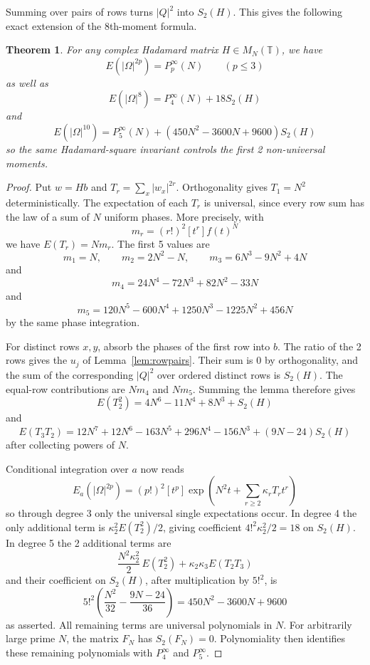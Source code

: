 \documentclass[11pt,a4paper]{article}
\newtheorem{thm}{Theorem}[section]
\theoremstyle{remark}
\begin{document}
Summing over pairs of rows turns $|Q|^2$ into $S_2(H)$. This gives the following exact extension of the 8th-moment formula.

\begin{samepage}
\begin{thm}\label{thm:s2}
For any complex Hadamard matrix $H\in M_N(\mathbb T)$, we have
\[
 E(|\Omega|^{2p})=P^\infty_p(N)\qquad (p\le3)
\]
as well as
\[
 E(|\Omega|^8)=P^\infty_4(N)+18S_2(H)
\]
and
\[
 E(|\Omega|^{10})
   =P^\infty_5(N)+(450N^2-3600N+9600)S_2(H)
\]
so the same Hadamard-square invariant controls the first 2 non-universal moments.
\end{thm}
\end{samepage}
\begin{proof}
Put $w=Hb$ and $T_r=\sum_x|w_x|^{2r}$. Orthogonality gives $T_1=N^2$ deterministically. The expectation of each $T_r$ is universal, since every row sum has the law of a sum of $N$ uniform phases. More precisely, with
\[
 m_r=(r!)^2[t^r]f(t)^N
\]
we have $E(T_r)=Nm_r$. The first 5 values are
\[
 m_1=N,\qquad m_2=2N^2-N,\qquad m_3=6N^3-9N^2+4N
\]
and
\[
 m_4=24N^4-72N^3+82N^2-33N
\]
and
\[
 m_5=120N^5-600N^4+1250N^3-1225N^2+456N
\]
by the same phase integration.

For distinct rows $x,y$, absorb the phases of the first row into $b$. The ratio of the 2 rows gives the $u_j$ of Lemma~\ref{lem:rowpairs}. Their sum is 0 by orthogonality, and the sum of the corresponding $|Q|^2$ over ordered distinct rows is $S_2(H)$. The equal-row contributions are $Nm_4$ and $Nm_5$. Summing the lemma therefore gives
\[
 E(T_2^2)=4N^6-11N^4+8N^3+S_2(H)
\]
and
\[
 E(T_3T_2)
 =12N^7+12N^6-163N^5+296N^4-156N^3+(9N-24)S_2(H)
\]
after collecting powers of $N$.

Conditional integration over $a$ now reads
\[
 E_a(|\Omega|^{2p})
  =(p!)^2[t^p]\exp\left(N^2t+\sum_{r\ge2}\kappa_rT_rt^r\right)
\]
so through degree 3 only the universal single expectations occur. In degree 4 the only additional term is $\kappa_2^2E(T_2^2)/2$, giving coefficient $4!^2\kappa_2^2/2=18$ on $S_2(H)$. In degree 5 the 2 additional terms are
\[
 \frac{N^2\kappa_2^2}{2}\,E(T_2^2)
       +\kappa_2\kappa_3E(T_2T_3)
\]
and their coefficient on $S_2(H)$, after multiplication by $5!^2$, is
\[
 5!^2\left(\frac{N^2}{32}-\frac{9N-24}{36}\right)
      =450N^2-3600N+9600
\]
as asserted. All remaining terms are universal polynomials in $N$. For arbitrarily large prime $N$, the matrix $F_N$ has $S_2(F_N)=0$. Polynomiality then identifies these remaining polynomials with $P^\infty_4$ and $P^\infty_5$.
\end{proof}
\end{document}
